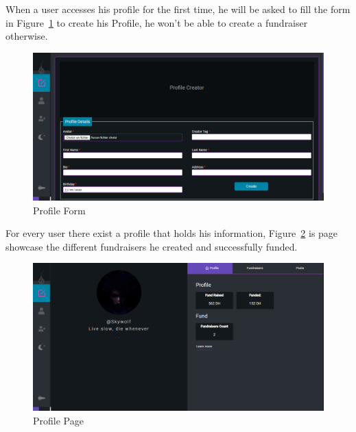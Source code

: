 When a user accesses his profile for the first time, he will be asked to fill the form in Figure~\ref{fig:profile form} 
to create his Profile, he won't be able to create a fundraiser otherwise.

\begin{figure}[H]
      \centering
      \includegraphics[scale=0.45]{assets/screen-profile-creator.png}
      \caption{Profile Form}
      \label{fig:profile form}
\end{figure}

For every user there exist a profile that holds his information, Figure~\ref{fig:profile view} is page showcase the different fundraisers 
he created and successfully funded.
\begin{figure}[H]
      \centering
      \includegraphics[scale=0.45]{assets/screen-profile-da.png}
      \caption{Profile Page}
      \label{fig:profile view}
\end{figure}

